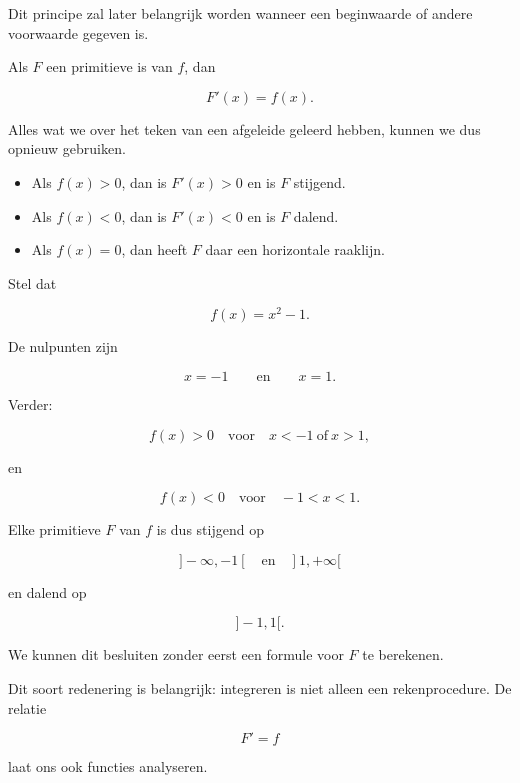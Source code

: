 \documentclass{ximera}
\begin{document}
Dit principe zal later belangrijk worden wanneer een beginwaarde of
andere voorwaarde gegeven is.



Als \(F\) een primitieve is van \(f\), dan

\[
F'(x)=f(x).
\]

Alles wat we over het teken van een afgeleide geleerd hebben, kunnen we
dus opnieuw gebruiken.

\begin{itemize}
    \item Als \(f(x)>0\), dan is \(F'(x)>0\) en is \(F\) stijgend.
    \item Als \(f(x)<0\), dan is \(F'(x)<0\) en is \(F\) dalend.
    \item Als \(f(x)=0\), dan heeft \(F\) daar een horizontale raaklijn.
\end{itemize}

\begin{voorbeeld}
Stel dat

\[
f(x)=x^2-1.
\]

De nulpunten zijn

\[
x=-1
\qquad\text{en}\qquad
x=1.
\]

Verder:

\[
f(x)>0
\quad\text{voor}\quad
x<-1\ \text{of}\ x>1,
\]

en

\[
f(x)<0
\quad\text{voor}\quad
-1<x<1.
\]

Elke primitieve \(F\) van \(f\) is dus stijgend op

\[
]-\infty,-1[
\quad\text{en}\quad
]1,+\infty[
\]

en dalend op

\[
]-1,1[.
\]

We kunnen dit besluiten zonder eerst een formule voor \(F\) te
berekenen.
\end{voorbeeld}

\begin{opmerking}
Dit soort redenering is belangrijk: integreren is niet alleen een
rekenprocedure. De relatie

\[
F'=f
\]

laat ons ook functies analyseren.
\end{opmerking}

\end{document}
